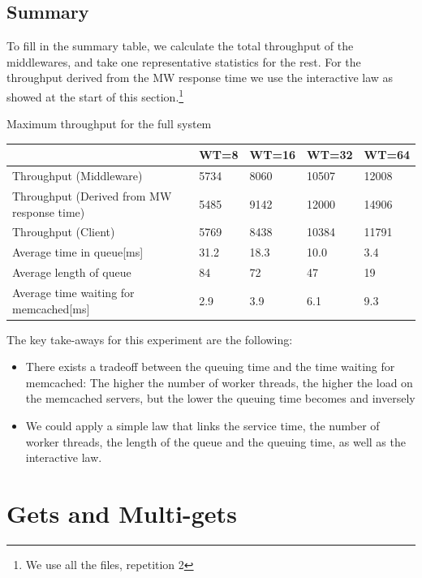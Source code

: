 \documentclass[11pt,a4paper]{article}
\begin{document}
\subsection{Summary}
To fill in the summary table, we calculate the total throughput of the middlewares, and take one representative statistics for the rest. For the throughput derived from the MW response time we use the interactive law as showed at the start of this section.\footnote{We use all the files, repetition 2} 
\begin{center}
	{Maximum throughput for the full system}
	\begin{tabular}{|l|p{1.5cm}|p{1.5cm}|p{1.5cm}|p{1.5cm}|}
		\hline                                            & WT=8 & WT=16 & WT=32 & WT=64 \\ 
		\hline Throughput (Middleware)                    &5734      &8060       &10507       &12008       \\ 
		\hline Throughput (Derived from MW response time) &5485      &9142       &12000       &14906       \\ 
		\hline Throughput (Client)                        &5769      &8438       &10384       &11791       \\ 
		\hline Average time in queue[ms]                      &31.2      &18.3       &10.0      &3.4       \\ 
		\hline Average length of queue                    &84      &72       &47       &19       \\ 
		\hline Average time waiting for memcached[ms]         &2.9      &3.9       &6.1       &9.3       \\ 
		\hline 
	\end{tabular}
\end{center}

The key take-aways for this experiment are the following: 
\begin{itemize}
\item There exists a tradeoff between the queuing time and the time waiting for memcached: The higher the number of worker threads, the higher the load on the memcached servers, but the lower the queuing time becomes and inversely
\item We could apply a simple law that links the service time, the number of worker threads, the length of the queue and the queuing time, as well as the interactive law. 
\end{itemize}
\newpage

\section{Gets and Multi-gets}
\end{document}
